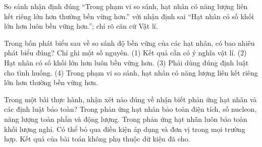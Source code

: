 \begin{bt}
So sánh nhận định đúng “Trong phạm vi so sánh, hạt nhân có năng lượng liên kết riêng lớn hơn thường bền vững hơn.” với nhận định sai “Hạt nhân có số khối lớn hơn luôn bền vững hơn.”; chỉ rõ căn cứ Vật lí.
\end{bt}

\begin{ex}
Trong bốn phát biểu sau về so sánh độ bền vững của các hạt nhân, có bao nhiêu phát biểu đúng? Chỉ ghi một số nguyên. (1) Kết quả cần có ý nghĩa vật lí. (2) Hạt nhân có số khối lớn hơn luôn bền vững hơn. (3) Phải dùng đúng định luật cho tình huống. (4) Trong phạm vi so sánh, hạt nhân có năng lượng liên kết riêng lớn hơn thường bền vững hơn.
\end{ex}

\begin{ex}
Trong một bài thực hành, nhận xét nào đúng về nhận biết phản ứng hạt nhân và các định luật bảo toàn?
\choice
{\True Trong phản ứng hạt nhân bảo toàn điện tích, số nucleon, năng lượng toàn phần và động lượng.}
{Trong phản ứng hạt nhân luôn bảo toàn khối lượng nghỉ.}
{Có thể bỏ qua điều kiện áp dụng và đơn vị trong mọi trường hợp.}
{Kết quả của bài toán không phụ thuộc dữ kiện đã cho.}
\end{ex}

